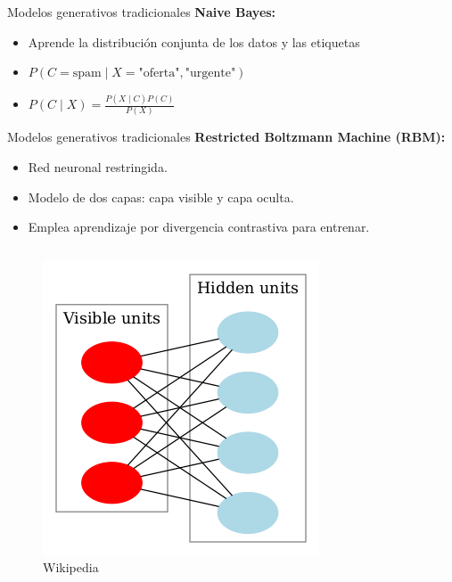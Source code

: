 \begin{frame}{Modelos generativos tradicionales}
\textbf{Naive Bayes:}
    \begin{itemize}
        \item Aprende la distribución conjunta de los datos y las etiquetas
        \item $P(C = \text{spam} \mid X = \text{"oferta"}, \text{"urgente"})$
        \item $P(C \mid X) = \frac{P(X \mid C) P(C)}{P(X)}$
    \end{itemize}
\end{frame}


\begin{frame}{Modelos generativos tradicionales}
\textbf{Restricted Boltzmann Machine (RBM):}
    \begin{itemize}
        \item Red neuronal restringida.
        \item Modelo de dos capas: capa visible y capa oculta.
        \item Emplea aprendizaje por divergencia contrastiva para entrenar.
    \end{itemize}
    
    \begin{columns}
    
        \begin{column}{0.4\textwidth}
            \begin{figure}
            \centering
            \includegraphics[width=\linewidth]{Slides/figures/02_Metodos_Generativos/Restricted_Boltzmann_machine.png}
            \caption{Wikipedia}
            \end{figure}
        \end{column}
        

\end{columns}
\end{frame}
